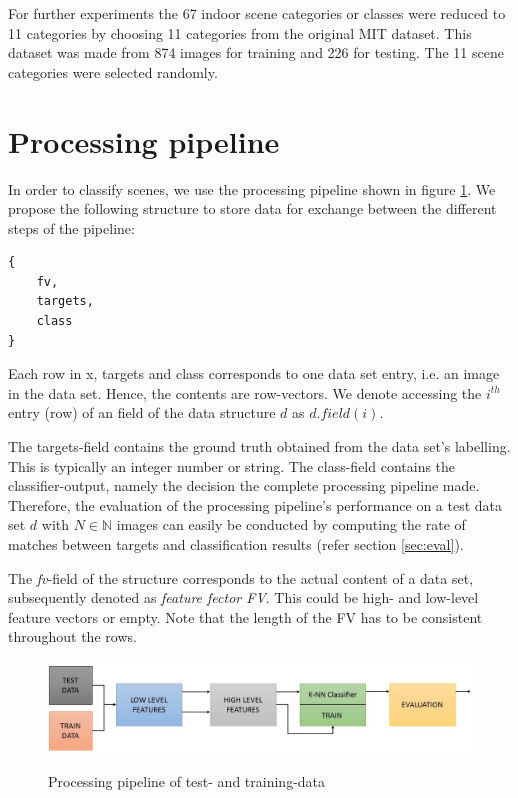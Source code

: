 \documentclass[10pt,twocolumn,letterpaper]{article}
\begin{document}
For further experiments the 67 indoor scene categories or classes were reduced to 11 categories by choosing 11 categories from the original MIT dataset. This dataset was made from 874 images for training and 226 for testing. The 11 scene categories were selected randomly.



\section{Processing pipeline}
In order to classify scenes, we use the processing pipeline shown in figure \ref{fig:pipeline}. We propose the following structure to store data for exchange between the different steps of the pipeline:


\begin{lstlisting}
{
	fv,
	targets,
	class
}
\end{lstlisting}

Each row in x, targets and class corresponds to one data set entry, i.e. an image in the data set. Hence, the contents are row-vectors. We denote accessing the $i^{th}$ entry (row) of an field of the data structure $d$ as $d.field(i)$. 

The targets-field contains the ground truth obtained from the data set's labelling. This is typically an integer number or string. The class-field contains the classifier-output, namely the decision the complete processing pipeline made. Therefore, the evaluation of the processing pipeline's performance on a test data set $d$ with $N \in \mathbb{N}$ images can easily be conducted by computing the rate of matches between targets and classification results (refer section \ref{sec:eval}).

The \emph{fv}-field of the structure corresponds to the actual content of a data set, subsequently denoted as \emph{feature fector FV}. This could be high- and low-level feature vectors or empty. Note that the length of the FV has to be consistent throughout the rows.


\begin{figure}
	\begin{center}
		

	\includegraphics[width=\linewidth]{img/12.jpg}
	\label{fig:pipeline}
	\caption{Processing pipeline of test- and training-data}
		\end{center}
\end{figure}
\end{document}
